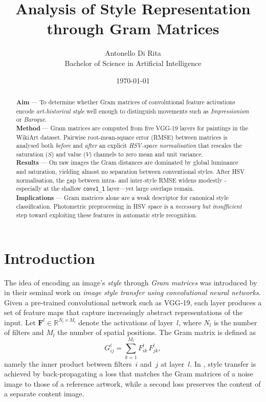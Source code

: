 \documentclass[a4paper,11pt]{article}
\begin{document}
\title{Analysis of Style Representation through Gram Matrices}
\author{Antonello Di Rita \\ Bachelor of Science in Artificial Intelligence}
\date{\today}
\maketitle

\begin{abstract}
\textbf{Aim} — To determine whether Gram matrices of convolutional feature activations encode \emph{art-historical style} well enough to distinguish movements such as \emph{Impressionism} or \emph{Baroque}.\\[2pt]
\textbf{Method} — Gram matrices are computed from five VGG-19 layers for paintings in the WikiArt dataset.  Pairwise root-mean-square error (RMSE) between matrices is analysed both \emph{before} and \emph{after} an explicit \emph{HSV-space normalisation} that rescales the saturation (\(S\)) and value (\(V\)) channels to zero mean and unit variance.\\[2pt]
\textbf{Results} — On raw images the Gram distances are dominated by global luminance and saturation, yielding almost no separation between conventional styles. After HSV normalisation, the gap between intra- and inter-style RMSE widens modestly - especially at the shallow \texttt{conv1\_1} layer—yet large overlaps remain.\\[2pt]
\textbf{Implications} — Gram matrices alone are a weak descriptor for canonical style classification.  Photometric preprocessing in HSV space is a \emph{necessary but insufficient} step toward exploiting these features in automatic style recognition.
\end{abstract}

\tableofcontents
\newpage

\section{Introduction}
The idea of encoding an image’s \emph{style} through \emph{Gram matrices} was introduced by \textcite{gatys2016} in their seminal work on \emph{image style transfer using convolutional neural networks}. Given a pre‑trained convolutional network such as VGG‑19, each layer produces a set of feature maps that capture increasingly abstract representations of the input. Let $\mathbf{F}^l \in \mathbb{R}^{N_l \times M_l}$ denote the activations of layer~$l$, where $N_l$ is the number of filters and $M_l$ the number of spatial positions. The Gram matrix is defined as
\begin{equation}
    G_{ij}^l = \sum_{k=1}^{M_l} F_{ik}^l \, F_{jk}^l,
    \label{eq:gram}
\end{equation}
namely the inner product between filters~$i$ and~$j$ at layer~$l$. In \textcite{gatys2016}, style transfer is achieved by back‑propagating a loss that matches the Gram matrices of a noise image to those of a reference artwork, while a second loss preserves the content of a separate content image.
\end{document}
